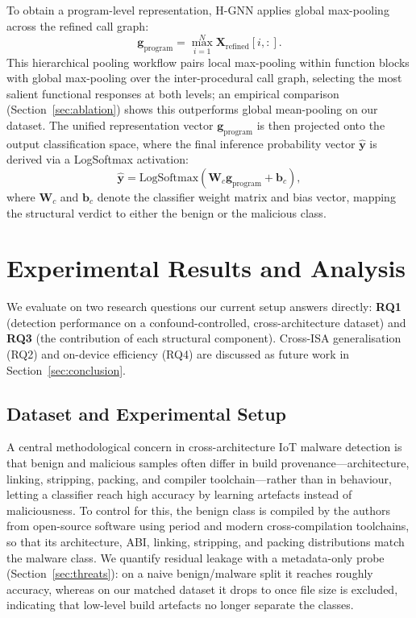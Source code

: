 \documentclass{llncs}
\begin{document}
To obtain a program-level representation, H-GNN applies global max-pooling across the refined call graph:
\begin{equation}
\mathbf{g}_{\text{program}} = \operatorname*{max}_{i=1}^{N} \mathbf{X}_{\text{refined}}[i, :].
\end{equation}
This hierarchical pooling workflow pairs local max-pooling within function blocks with global max-pooling over the inter-procedural call graph, selecting the most salient functional responses at both levels; an empirical comparison (Section~\ref{sec:ablation}) shows this outperforms global mean-pooling on our dataset. The unified representation vector $\mathbf{g}_{\text{program}}$ is then projected onto the output classification space, where the final inference probability vector $\hat{\mathbf{y}}$ is derived via a LogSoftmax activation:
\begin{equation}
\hat{\mathbf{y}} = \mathrm{LogSoftmax}\left(\mathbf{W}_{c} \mathbf{g}_{\text{program}} + \mathbf{b}_{c}\right),
\end{equation}
where $\mathbf{W}_{c}$ and $\mathbf{b}_{c}$ denote the classifier weight matrix and bias vector, mapping the structural verdict to either the benign or the malicious class.

\section{Experimental Results and Analysis}
\label{sec:experiments}

We evaluate  on two research questions our current setup
answers directly: \textbf{RQ1} (detection performance on a
confound-controlled, cross-architecture dataset) and \textbf{RQ3} (the
contribution of each structural component). Cross-ISA generalisation
(RQ2) and on-device efficiency (RQ4) are discussed as future work in
Section~\ref{sec:conclusion}.

\subsection{Dataset and Experimental Setup}
\label{sec:setup}

A central methodological concern in cross-architecture IoT malware
detection is that benign and malicious samples often differ in build
provenance---architecture, linking, stripping, packing, and compiler
toolchain---rather than in behaviour, letting a classifier reach high
accuracy by learning artefacts instead of maliciousness. To control for
this, the benign class is compiled by the authors from open-source
software using period and modern cross-compilation toolchains, so that its
architecture, ABI, linking, stripping, and packing distributions match
the malware class. We quantify residual leakage with a metadata-only
probe (Section~\ref{sec:threats}): on a naive benign/malware split it
reaches roughly \probeOld{} accuracy, whereas on our matched dataset it
drops to \probeNew{} once file size is excluded, indicating that low-level
build artefacts no longer separate the classes.
\end{document}
